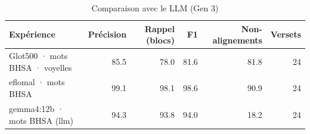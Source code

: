 \begin{table}[ht]
\centering
\caption{Comparaison avec le LLM (Gen 3)}
\label{tab:comparaison_avec_le_llm_gen_3}
\begin{tabular}{lrrrrr}
\toprule
Expérience & Précision & Rappel (blocs) & F1 & Non-alignements & Versets \\
\midrule
Glot500 · mots BHSA · voyelles & 85.5 & 78.0 & 81.6 & 81.8 & 24 \\
eflomal · mots BHSA & 99.1 & 98.1 & 98.6 & 90.9 & 24 \\
gemma4:12b · mots BHSA (llm) & 94.3 & 93.8 & 94.0 & 18.2 & 24 \\
\bottomrule
\end{tabular}
\end{table}
